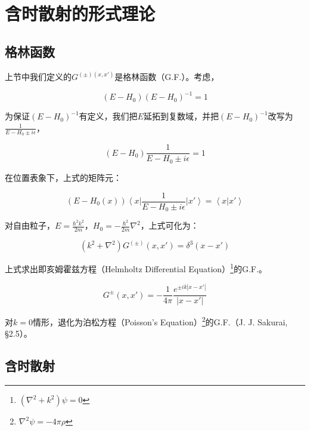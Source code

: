 \section{含时散射的形式理论}

\subsection{格林函数}

上节中我们定义的$G^{(\pm)(x,x')}$是格林函数（G.F.）。考虑，

\begin{equation}
(E - H_0)(E - H_0)^{-1}= 1
\end{equation}

为保证$(E - H_0)^{-1}$有定义，我们把$E$延拓到复数域，并把$(E - H_0)^{-1}$改写为$\frac{1}{E - H_0 \pm i \epsilon}$，

\begin{equation}
(E - H_0)\frac{1 }{E - H_0 \pm i \epsilon}= 1
\end{equation}

在位置表象下，上式的矩阵元：

\begin{equation}
(E - H_0(x) ) \left\langle x \right| \frac{1}{E - H_0 \pm i \epsilon } \left| x' \right\rangle = \left\langle x | x' \right\rangle
\end{equation}

对自由粒子，$E = \frac{\hbar^2 k^2 }{2m}$，$H_0 = -\frac{\hbar^2}{2m }\nabla^2$，上式可化为：

\begin{equation}
(k^2 + \nabla^2 ) G^{(\pm)}(x,x') = \delta^3 (x-x')
\end{equation}

上式求出即亥姆霍兹方程（Helmholtz Differential Equation）\footnote{ $ ( \nabla^2 + k^2 ) \psi = 0 $}的G.F.。

\begin{equation}
G^{\pm}(x,x') = - \frac{1}{4 \pi} \frac{e^{\pm i k |x-x'|}}{|x-x'|}
\end{equation}

对$k=0$情形，退化为泊松方程（Poisson's Equation）\footnote{$\nabla^2 \psi = - 4 \pi \rho$}的G.F.（J. J. Sakurai, \S 2.5）。

\subsection{含时散射}


